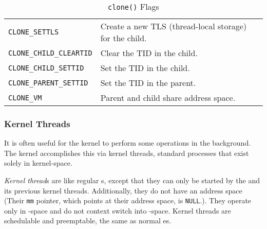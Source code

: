 \begin{table}[h!tbp]
\begin{tabular}{ll}
    \texttt{CLONE_SETTLS} & Create a new TLS (thread-local storage) for the child. \\
    \texttt{CLONE_CHILD_CLEARTID} & Clear the TID in the child. \\
    \texttt{CLONE_CHILD_SETTID} & Set the TID in the child. \\
    \texttt{CLONE_PARENT_SETTID} & Set the TID in the parent. \\
    \texttt{CLONE_VM} & Parent and child share address space. \\
    \bottomrule
  \end{tabular}
  \caption{\texttt{clone()} Flags}
  \label{tab:Clone_Flags}
\end{table}

\subsubsection{Kernel Threads}\label{subsubsec:Kernel_Threads}
It is often useful for the kernel to perform some operations in the background.
The kernel accomplishes this via kernel threads, standard processes that exist solely in kernel-space.

\begin{definition}\label{def:Kernel_Thread}
  \emph{Kernel thread}s are like regular s, except that they can only be started by the  and its previous kernel threads.
  Additionally, they do not have an address space (Their \texttt{mm} pointer, which points at their address space, is \texttt{NULL}.).
  They operate only in -space and do not context switch into -space.
  Kernel threads are schedulable and preemptable, the same as normal es.
\end{definition}


